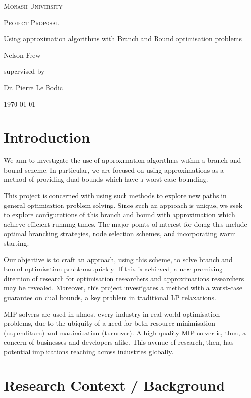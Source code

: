 \documentclass[12pt, a4paper]{article}
\begin{document}
\begin{titlepage}
  \centering
  {\scshape\LARGE Monash University \par}
  \vspace{1cm}
  {\scshape\Large Project Proposal \par}
  \vspace{1.5cm}
  {\huge Using approximation algorithms with Branch and Bound optimisation problems\par}
  \vspace{2cm}
  {\Large Nelson Frew\par}
  \vfill
  supervised by\par
  Dr. Pierre Le Bodic
  \vfill
  {\large \today\par}
\end{titlepage}
\tableofcontents
\newpage
\section{Introduction}
We aim to investigate the use of approximation algorithms within a branch and bound scheme. In particular, we are focused on using approximations as a method of providing dual bounds which have a worst case bounding. 

This project is concerned with using such methods to explore new paths in general optimisation problem solving. Since such an approach is unique, we seek to explore configurations of this branch and bound with approximation which achieve efficient running times. The major points of interest for doing this include optimal branching strategies, node selection schemes, and incorporating warm starting.

Our objective is to craft an approach, using this scheme, to solve branch and bound optimisation problems quickly. If this is achieved, a new promising direction of research for optimisation researchers and approximations researchers may be revealed. Moreover, this project investigates a method with a worst-case guarantee on dual bounds, a key problem in traditional LP relaxations.

MIP solvers are used in almost every industry in real world optimisation problems, due to the ubiquity of a need for both resource minimisation (expenditure) and maximisation (turnover). A high quality MIP solver is, then, a concern of businesses and developers alike. This avenue of research, then, has potential implications reaching across industries globally.

\section{Research Context / Background}
\end{document}
